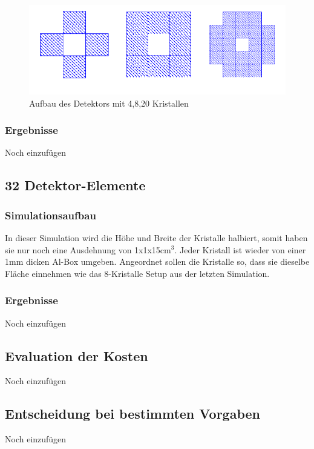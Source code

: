 \documentclass[a4paper,14pt,twoside]{article}
\begin{document}
			\begin{figure}[H]
				\begin{center}
				\includegraphics[width=0.7\linewidth]{Aufbau}
				\caption{Aufbau des Detektors mit 4,8,20 Kristallen}
				\label{fig:Aufbau}
				\end{center}
			\end{figure}


		\subsubsection{Ergebnisse}
			{\color{Red} Noch einzufügen}
			
			
			
			
			
			
	\subsection{32 Detektor-Elemente}
		\subsubsection{Simulationsaufbau}
			In dieser Simulation wird die Höhe und Breite der Kristalle halbiert, somit haben sie nur noch eine Ausdehnung von 1x1x15cm$^3$. Jeder Kristall ist wieder von einer 1mm dicken Al-Box umgeben. Angeordnet sollen die Kristalle so, dass sie dieselbe Fläche einnehmen wie das 8-Kristalle Setup aus der letzten Simulation. 
			
			
			
		\subsubsection{Ergebnisse}
			{\color{Red} Noch einzufügen}
			
			
			
	\subsection{Evaluation der Kosten}
		{\color{Red} Noch einzufügen}
		
		
		
	\subsection{Entscheidung bei bestimmten Vorgaben}
		{\color{Red} Noch einzufügen}
\end{document}
